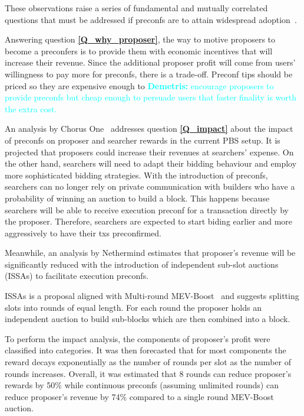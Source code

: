 \documentclass[a4paper]{article}
\theoremstyle{boldstyle}
\newcommand{\dk}[1]{\textcolor{cyan}{\textbf{Demetris:} #1}}
\begin{document}
    These observations raise a series of fundamental and mutually correlated questions that must be addressed if preconfs are to attain widespread adoption~\cite{W:EconomicViabilityofPreconfirmations}. 

    
    Answering question \textbf{\ref{Q_why_proposer}}, the way to motive proposers to become a preconfers is to provide them with economic incentives that will increase their revenue. Since the additional proposer profit will come from users' willingness to pay more for preconfs, there is a trade-off. Preconf tips should be priced so they are expensive enough to \dk{encourage proposers to provide preconfs but cheap enough to persuade users that faster finality is worth the extra cost.   }
 
    An analysis by Chorus One~\cite{W:PreconfirmationsundertheNOlens} addresses question \textbf{\ref{Q_impact}} about the impact of preconfs on proposer and searcher rewards in the current PBS setup. It is projected that proposers could increase their revenues at searchers' expense. On the other hand, searchers will need to adapt their bidding behaviour and employ more sophisticated bidding strategies. With the introduction of preconfs, searchers can no longer rely on private communication with builders who have a probability of winning an auction to build a block. This happens because searchers will be able to receive execution preconf for a transaction directly by the proposer. Therefore, searchers are expected to start biding earlier and more aggressively to have their txs preconfirmed.

    Meanwhile, an analysis by Nethermind \cite{W:EstimatingtheRevenuefromIndependentSub-SlotAuctionPreconfirmations} estimates that proposer's revenue will be significantly reduced with the introduction of independent sub-slot auctions (ISSAs) to facilitate execution preconfs.
        
    ISSAs is a proposal aligned with Multi-round MEV-Boost~\cite{W:BasedPreconfirmationswithMulti-roundMEV-Boost} and suggests splitting slots into rounds of equal length. For each round the proposer holds an independent auction to build sub-blocks which are then combined into a block.

    To perform the impact analysis, the components of proposer's profit were classified into categories. It was then forecasted that for most components the reward decays exponentially as the number of rounds per slot as the number of rounds increases. Overall, it was estimated that 8 rounds can reduce proposer's rewards by 50\% while continuous preconfs (assuming unlimited rounds) can reduce proposer's revenue by 74\% compared to a single round MEV-Boost auction.
\end{document}
